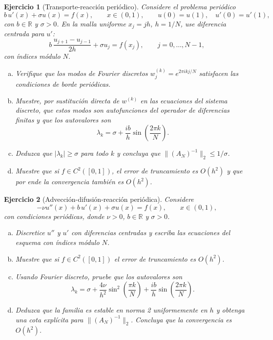 \documentclass[12pt]{article}
\newtheorem{exercise}{Ejercicio}
\newcommand{\R}{\mathbb{R}}
\begin{document}
\begin{exercise}[Transporte-reacción periódico]
Considere el problema periódico
\[
  b\,u'(x)+\sigma u(x)=f(x),\qquad x\in(0,1),\qquad u(0)=u(1),\quad u'(0)=u'(1),
\]
con $b\in\R$ y $\sigma>0$. En la malla uniforme $x_j=jh$, $h=1/N$, use diferencia centrada para $u'$:
\[
  b\,\frac{u_{j+1}-u_{j-1}}{2h}+\sigma u_j=f(x_j),\qquad j=0,\dots,N-1,
\]
con índices módulo $N$.
\begin{enumerate}[(a)]
\item Verifique que los modos de Fourier discretos $w_j^{(k)}=e^{2\pi i kj/N}$ satisfacen las condiciones de borde periódicas.
\item Muestre, por sustitución directa de $w^{(k)}$ en las ecuaciones del sistema discreto, que estos modos son autofunciones del operador de diferencias finitas y que los autovalores son
\[
  \lambda_k=\sigma+\frac{ib}{h}\sin\!\left(\frac{2\pi k}{N}\right).
\]
\item Deduzca que $|\lambda_k|\ge \sigma$ para todo $k$ y concluya que $\|(A_N)^{-1}\|_2\le 1/\sigma$.
\item Muestre que si $f\in C^2([0,1])$, el error de truncamiento es $O(h^2)$ y que por ende la convergencia también es $O(h^2)$.
\end{enumerate}
\end{exercise}

\begin{exercise}[Advección-difusión-reacción periódica]
Considere
\[
  -\nu u''(x)+b\,u'(x)+\sigma u(x)=f(x),\qquad x\in(0,1),
\]
con condiciones periódicas, donde $\nu>0$, $b\in\R$ y $\sigma>0$.
\begin{enumerate}[(a)]
\item Discretice $u''$ y $u'$ con diferencias centradas y escriba las ecuaciones del esquema con índices módulo $N$.
\item Muestre que si $f\in C^2([0,1])$ el error de truncamiento es $O(h^2)$.
\item Usando Fourier discreto, pruebe que los autovalores son
\[
  \lambda_k=\sigma+\frac{4\nu}{h^2}\sin^2\!\left(\frac{\pi k}{N}\right)+\frac{ib}{h}\sin\!\left(\frac{2\pi k}{N}\right).
\]
\item Deduzca que la familia es estable en norma 2 uniformemente en $h$ y obtenga una cota explícita para $\|(A_N)^{-1}\|_2$. Concluya que la convergencia es $O(h^2)$.
\end{enumerate}
\end{exercise}
\end{document}
